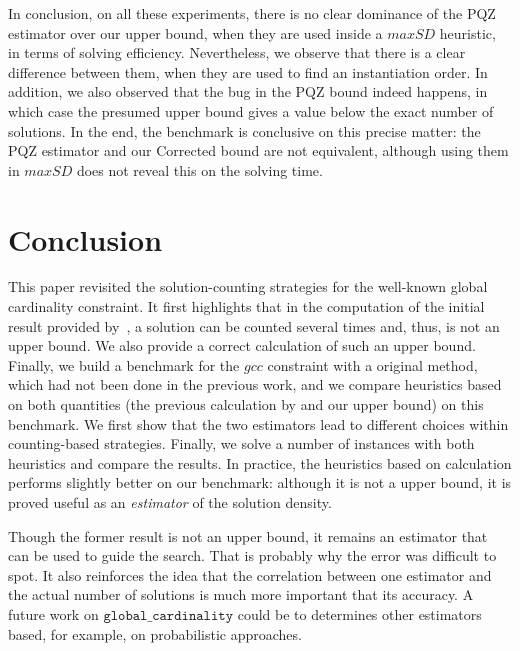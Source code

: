 \documentclass[jair,twoside,11pt,theapa]{article}
\begin{document}
In conclusion, on all these experiments, there is no clear dominance of the PQZ estimator over our upper bound, when they are used inside a $maxSD$ heuristic, in terms of solving efficiency. Nevertheless, we observe that there is a clear difference between them, when they are used to find an instantiation order. In addition, we also observed that the bug in the PQZ bound indeed happens, in which case the presumed upper bound gives a value below the exact number of solutions. In the end, the benchmark is conclusive on this precise matter: the PQZ estimator and our Corrected bound are not equivalent, although using them in $maxSD$ does not reveal this on the solving time.



\section{Conclusion}
This paper revisited the solution-counting strategies for the well-known global cardinality constraint. It first highlights that in the computation of the initial result provided by~\cite{PesantQZ12}, a solution can be counted several times and, thus, is not an upper bound. We also provide a correct calculation of such an upper bound. Finally, we build a benchmark for the $gcc$ constraint with a original method, which had not been done in the previous work, and we compare heuristics based on both quantities (the previous calculation by \cite{PesantQZ12} and our upper bound) on this benchmark. We first show that the two estimators lead to different choices within counting-based strategies. Finally, we solve a number of instances with both heuristics and compare the results. In practice, the heuristics based on \cite{PesantQZ12} calculation performs slightly better on our benchmark: although it is not a upper bound, it is proved useful as an \textit{estimator} of the solution density.

 Though the former result is not an upper bound, it remains an estimator that can be used to guide the search. That is probably why the error was difficult to spot. It also reinforces the idea that the correlation between one estimator and the actual number of solutions is much more important that its accuracy. A future work on $\texttt{global\_cardinality}$ could be to determines other estimators based, for example, on probabilistic approaches.
 
 
\end{document}
